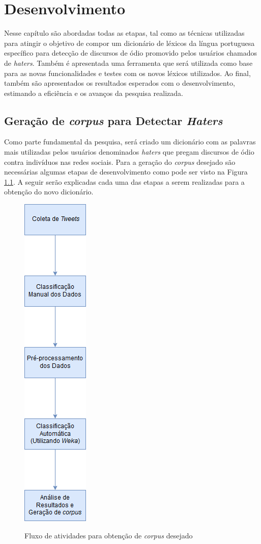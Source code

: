 \chapter{Desenvolvimento}
\label{cap:Desenvolvimento}
Nesse capítulo são abordadas todas as etapas, tal como as técnicas utilizadas para atingir o objetivo de compor um dicionário de léxicos da língua portuguesa específico para detecção de discursos de ódio promovido pelos usuários chamados de \textit{haters}. Também é apresentada uma ferramenta que será utilizada como base para as novas funcionalidades e testes com os novos léxicos utilizados. Ao final, também são apresentados os resultados esperados com o desenvolvimento, estimando a eficiência e os avanços da pesquisa realizada. 

\section{Geração de \textit{corpus} para Detectar \textit{Haters}}
\label{sec:geracaohater}
Como parte fundamental da pesquisa, será criado um dicionário com as palavras mais utilizadas pelos usuários denominados \textit{haters} que pregam discursos de ódio contra indivíduos nas redes sociais. Para a geração do \textit{corpus} desejado são necessárias algumas etapas de desenvolvimento como pode ser visto na Figura \ref{fig:fluxodesenvolvimento}. A seguir serão explicadas cada uma das etapas a serem realizadas para a obtenção do novo dicionário.

\begin{figure}[!h]
\centering 
\caption{Fluxo de atividades para obtenção de \textit{corpus} desejado}
\includegraphics[scale=0.45]{imagens/fluxodesenvolvimento.png}
\label{fig:fluxodesenvolvimento}
\end{figure}

